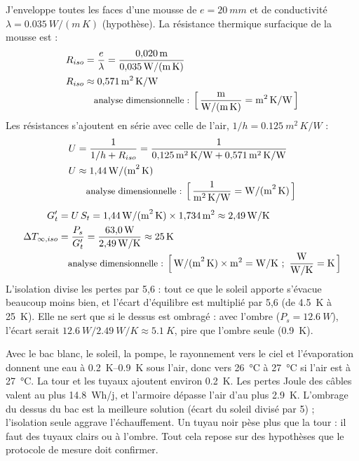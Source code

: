 \begin{demonstration}
J'enveloppe toutes les faces d'une mousse de $e = \qty{20}{mm}$ et de conductivité $\lambda = \qty{0,035}{W/(m\,K)}$ (hypothèse). La résistance thermique surfacique de la mousse est :
\begin{align*}
R_{iso} &= \frac{e}{\lambda} = \frac{\qty{0,020}{m}}{\qty{0,035}{W/(m\,K)}}\\
R_{iso} &\approx \qty{0,571}{m^2\,K/W}\\
\dimline{\dfrac{\unit{m}}{\unit{W/(m\,K)}}=\unit{m^2\,K/W}}
\end{align*}
Les résistances s'ajoutent en série avec celle de l'air, $1/h = \qty{0,125}{m^2\,K/W}$ :
\begin{align*}
U &= \frac{1}{1/h + R_{iso}} = \frac{1}{\qty{0,125}{m^2\,K/W} + \qty{0,571}{m^2\,K/W}}\\
U &\approx \qty{1,44}{W/(m^2\,K)}\\
\dimline{\dfrac{1}{\unit{m^2\,K/W}}=\unit{W/(m^2\,K)}}
\end{align*}
\begin{align*}
G_t' &= U\,S_t = \qty{1,44}{W/(m^2\,K)} \times \qty{1,734}{m^2} \approx \qty{2,49}{W/K}\\
\Delta T_{\infty,iso} &= \frac{P_s}{G_t'} = \frac{\qty{63,0}{W}}{\qty{2,49}{W/K}} \approx \qty{25}{K}\\
\dimline{\unit{W/(m^2\,K)}\times\unit{m^2}=\unit{W/K}\ ;\ \dfrac{\unit{W}}{\unit{W/K}}=\unit{K}}
\end{align*}
L'isolation divise les pertes par 5,6 : tout ce que le soleil apporte s'évacue beaucoup moins bien, et l'écart d'équilibre est multiplié par 5,6 (de \qty{4,5}{K} à \qty{25}{K}). Elle ne sert que si le dessus est ombragé : avec l'ombre ($P_s = \qty{12,6}{W}$), l'écart serait $\qty{12,6}{W}/\qty{2,49}{W/K} \approx \qty{5,1}{K}$, pire que l'ombre seule (\qty{0,9}{K}).
\end{demonstration}

\begin{aretenir}
Avec le bac blanc, le soleil, la pompe, le rayonnement vers le ciel et l'évaporation donnent une eau à \qtyrange{0,2}{0,9}{K} sous l'air, donc vers \qty{26}{\celsius} à \qty{27}{\celsius} si l'air est à \qty{27}{\celsius}. La tour et les tuyaux ajoutent environ \qty{0,2}{K}. Les pertes Joule des câbles valent au plus \qty{14,8}{Wh/j}, et l'armoire dépasse l'air d'au plus \qty{2,9}{K}. L'ombrage du dessus du bac est la meilleure solution (écart du soleil divisé par 5) ; l'isolation seule aggrave l'échauffement. Un tuyau noir pèse plus que la tour : il faut des tuyaux clairs ou à l'ombre. Tout cela repose sur des hypothèses que le protocole de mesure doit confirmer.
\end{aretenir}

